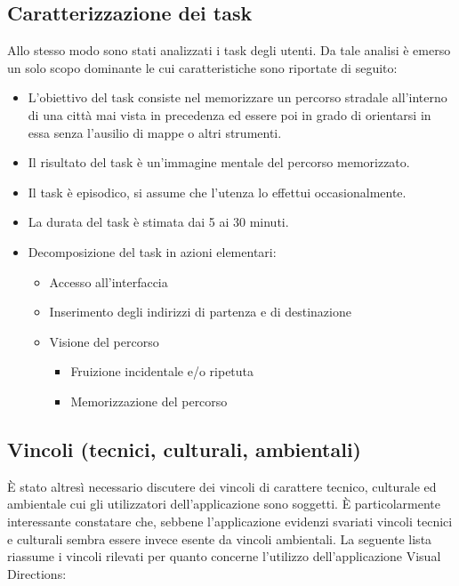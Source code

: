 \documentclass[12pt,a4paper,openright, notitlepage]{report}
\begin{document}
\subsection{Caratterizzazione dei task}

Allo stesso modo sono stati analizzati i task degli utenti. Da tale analisi è emerso un solo scopo dominante le cui caratteristiche sono riportate di seguito:

\begin{itemize}
	\item L’obiettivo del task consiste nel memorizzare un percorso stradale all’interno di una città  mai vista in precedenza ed essere poi in grado di orientarsi in essa senza l’ausilio di mappe o altri strumenti.
	\item Il risultato del task è un’immagine mentale del percorso memorizzato.
	\item Il task è episodico, si assume che l’utenza lo effettui occasionalmente.
	\item La durata del task è stimata dai 5 ai 30 minuti.
	\item Decomposizione del task in azioni elementari:
		\begin{itemize}		
			\item Accesso all’interfaccia
			\item Inserimento degli indirizzi di partenza e di destinazione
			\item Visione del percorso
			\begin{itemize}
				\item Fruizione incidentale e/o ripetuta
				\item Memorizzazione del percorso
			\end{itemize}
		\end{itemize}
\end{itemize}

\subsection{Vincoli (tecnici, culturali, ambientali)}

È stato altresì necessario discutere dei vincoli di carattere tecnico, culturale ed ambientale cui gli utilizzatori dell’applicazione sono soggetti. È particolarmente interessante constatare che, sebbene l’applicazione evidenzi svariati vincoli tecnici e culturali sembra essere invece esente da vincoli ambientali. La seguente lista riassume i vincoli rilevati per quanto concerne l’utilizzo dell’applicazione Visual Directions:
\end{document}
